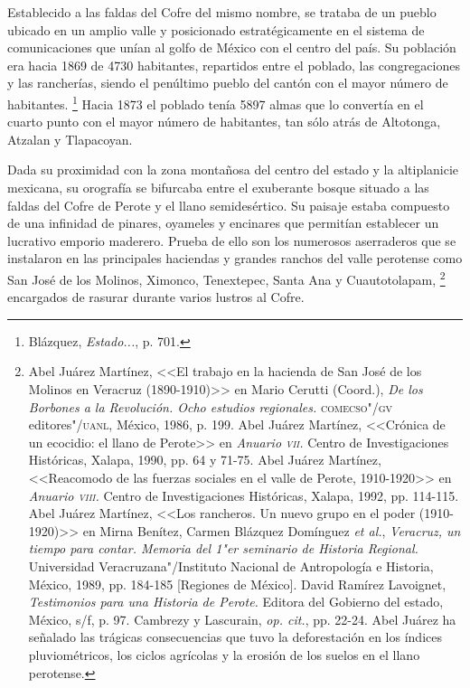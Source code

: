 \documentclass[14pt,twoside,final]{extbook} %
\let\oldfootnote\footnote
\renewcommand\footnote[1]{%
\oldfootnote{\hspace{1mm}#1}}
\begin{document}
Establecido a las faldas del Cofre del mismo nombre, se trataba de un pueblo ubicado en un amplio valle y posicionado estratégicamente en el sistema de comunicaciones que unían al golfo de México con el centro del país. Su población era hacia 1869 de 4730 habitantes, repartidos entre el poblado, las congregaciones y las rancherías, siendo el penúltimo pueblo del cantón con el mayor número de habitantes.\footnote{Blázquez, \emph{Estado...}, p. 701.} Hacia 1873 el poblado tenía 5897 almas que lo convertía en el cuarto punto con el mayor número de habitantes, tan sólo atrás de Altotonga, Atzalan y Tlapacoyan.

Dada su proximidad con la zona montañosa del centro del estado y la altiplanicie mexicana, su orografía se bifurcaba entre el exuberante bosque situado a las faldas del Cofre de Perote y el llano semidesértico. Su paisaje estaba compuesto de una infinidad de pinares, oyameles y encinares que permitían establecer un lucrativo emporio maderero. Prueba de ello son los numerosos aserraderos que se instalaron en las principales haciendas y grandes ranchos del valle perotense como San José de los Molinos, Ximonco, Tenextepec, Santa Ana y Cuautotolapam,\footnote{Abel Juárez Martínez, <<El trabajo en la hacienda de San José de los Molinos en Veracruz \mbox{(1890-1910)}>> en Mario Cerutti (Coord.), \emph{De los Borbones a la Revolución. Ocho estudios regionales.} \textsc{comecso"/gv} editores"/\textsc{uanl}, México, 1986, p. 199. Abel Juárez Martínez, <<Crónica de un ecocidio: el llano de Perote>> en \emph{Anuario \textsc{vii}.} Centro de Investigaciones Históricas, Xalapa, 1990, pp. 64 y 71-75. Abel Juárez Martínez, <<Reacomodo de las fuerzas sociales en el valle de Perote, 1910-1920>> en \emph{Anuario \textsc{viii}.} Centro de Investigaciones Históricas, Xalapa, 1992, pp. 114-115. Abel Juárez Martínez, <<Los rancheros. Un nuevo grupo en el poder (1910-1920)>> en Mirna Benítez, Carmen Blázquez Domínguez \emph{et al.}, \emph{Veracruz, un tiempo para contar. Memoria del 1"er seminario de Historia Regional.} Universidad Veracruzana"/Instituto Nacional de Antropología e Historia, México, 1989, pp. 184-185 [Regiones de México]. David Ramírez Lavoignet, \emph{Testimonios para una Historia de Perote.} Editora del Gobierno del estado, México, s/f, p. 97. Cambrezy y Lascurain, \emph{op. cit.}, pp. 22-24. Abel Juárez ha señalado las trágicas consecuencias que tuvo la deforestación en los índices pluviométricos, los ciclos agrícolas y la erosión de los suelos en el llano perotense.} encargados de rasurar durante varios lustros al Cofre.
\end{document}
